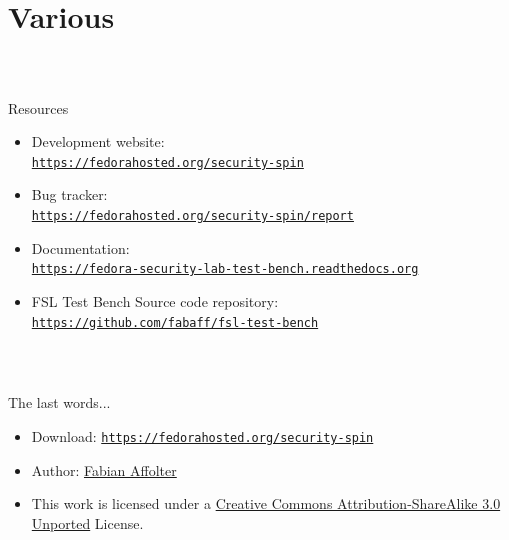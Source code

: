 \section{Various}
%
\begin{frame}
\frametitle{\\}
%
{\LARGE Resources \newline}
\begin{itemize}
  \item Development website: \\ {\scriptsize\texttt{\href{https://fedorahosted.org/security-spin}{https://fedorahosted.org/security-spin}}}
  \item Bug tracker: \\ {\scriptsize\texttt{\href{https://fedorahosted.org/security-spin/report}{https://fedorahosted.org/security-spin/report}}}
  \item Documentation: \\ {\scriptsize\texttt{\href{https://fedora-security-lab-test-bench.readthedocs.org}{https://fedora-security-lab-test-bench.readthedocs.org}}}
  \item FSL Test Bench Source code repository: \\ {\scriptsize \texttt{\href{https://github.com/fabaff/fsl-test-bench}{https://github.com/fabaff/fsl-test-bench}}}
\end{itemize}
\end{frame}
%
\begin{frame}
\frametitle{\\}
%
{\LARGE The last words... \newline}
\begin{itemize}
  \item Download: {\scriptsize\texttt{\href{https://fedorahosted.org/security-spin}{https://fedorahosted.org/security-spin}}}
  \item Author: \href{mailto:fab@fedoraproject.org}{Fabian Affolter}
  \item This work is licensed under a \href{http://creativecommons.org/licenses/by-sa/3.0/deed.en_US}{Creative Commons Attribution-ShareAlike 3.0 Unported} License. 
\end{itemize}
\end{frame}
%
